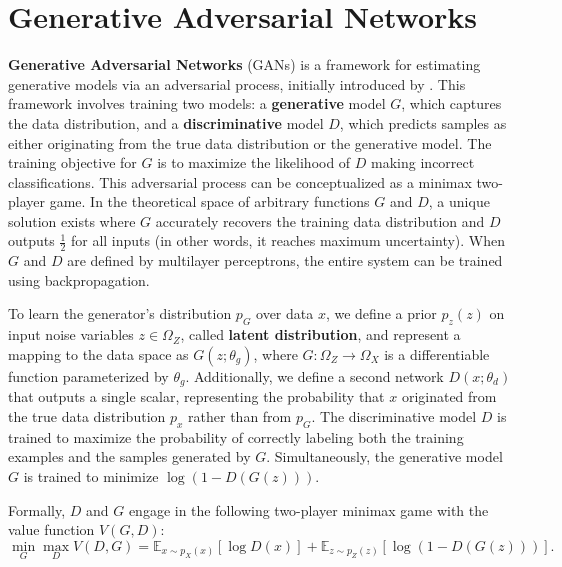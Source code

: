 \section{Generative Adversarial Networks}
\label{sec:gan}

\textbf{Generative Adversarial Networks} (GANs) is a framework
for estimating generative models via an adversarial process,
initially introduced by \cite{goodfellow2014}.
This framework involves training two models:
a \textbf{generative} model \( G \), which captures the data
distribution, and a \textbf{discriminative} model \( D \),
which predicts samples as either originating from the true
data distribution or the generative model.
The training objective for \( G \) is to maximize
the likelihood of \( D \) making incorrect classifications.
This adversarial process can be conceptualized as a minimax two-player game.
In the theoretical space of arbitrary functions \( G \) and \( D \),
a unique solution exists where \( G \) accurately
recovers the training data distribution and \( D \) outputs $\frac{1}{2}$
for all inputs (in other words, it reaches maximum uncertainty).
When \( G \) and \( D \) are defined by multilayer perceptrons,
the entire system can be trained using backpropagation.

To learn the generator's distribution \( p_G \)
over data \( x \), we define a prior \( p_z(z) \) on input noise variables
$z \in \Omega_Z$, called \textbf{latent distribution},
and represent a mapping to the data space as
\( G(z; \theta_g) \), where \( G: \Omega_Z \rightarrow \Omega_X \)
is a differentiable function parameterized by \( \theta_g \).
Additionally, we define a second network
\( D(x; \theta_d) \) that outputs a single scalar,
representing the probability that \( x \) originated
from the true data distribution $p_x$ rather than from \( p_G \).
The discriminative model \( D \) is trained to maximize
the probability of correctly labeling both the training
examples and the samples generated by \( G \).
Simultaneously, the generative model \( G \) is trained to minimize
\( \log(1 - D(G(z))) \).

Formally, \( D \) and \( G \) engage in the following
two-player minimax game with the value function \( V(G, D) \):
\begin{equation}
\min_G \max_D V(D, G) = \mathbb{E}_{x \sim p_X(x)}[\log D(x)] + \mathbb{E}_{z \sim p_Z(z)}[\log (1 - D(G(z)))].
\end{equation}

